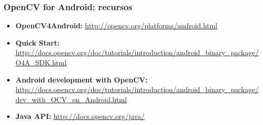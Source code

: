\frame
{
\frametitle{OpenCV for Android: recursos}
\begin{itemize}
\item \textbf{OpenCV4Android:} \url{http://opencv.org/platforms/android.html}
\item \textbf{Quick Start:} \url{http://docs.opencv.org/doc/tutorials/introduction/android_binary_package/O4A_SDK.html}
\item \textbf{Android development with OpenCV:} \url{http://docs.opencv.org/doc/tutorials/introduction/android_binary_package/dev_with_OCV_on_Android.html}
\item \textbf{Java API:} \url{http://docs.opencv.org/java/}
\end{itemize}
}
